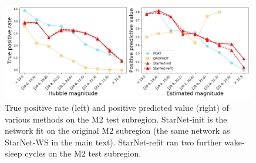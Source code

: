 \begin{figure}[tb]
    \centering
    \includegraphics[width=0.99\textwidth]{figures/m2_test/summary_statistics_m2.png}
    \caption{True positive rate (left) and positive predicted value (right) of various methods on the M2 test subregion. 
    StarNet-init is the network fit on the original M2 subregion (the same network as StarNet-WS in the main text). 
StarNet-refit ran two further wake-sleep cycles on the M2 test subregion. 
    }
    \label{fig:summary_stats_m2test}
\end{figure}
